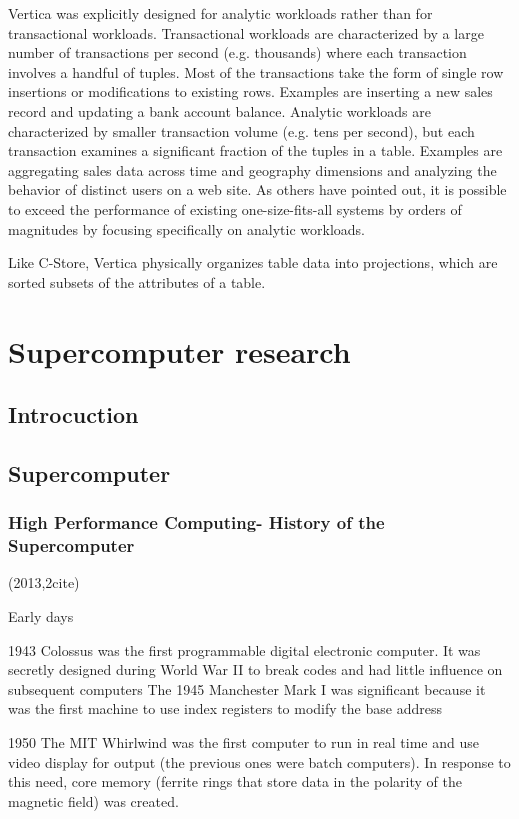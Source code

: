 \documentclass[a4paper,twoside]{scrbook}
\begin{document}
Vertica was explicitly designed for analytic workloads rather than for transactional workloads.
Transactional workloads are characterized by a large number of transactions per second (e.g. thousands) where each transaction involves a handful of tuples. Most of the transactions take the form of single row insertions or modifications to existing rows. Examples are inserting a new sales record and updating a bank account balance.
Analytic workloads are characterized by smaller transaction volume (e.g. tens per second), but each transaction examines a significant fraction of the tuples in a table. Examples are aggregating sales data across time and geography dimensions and analyzing the behavior of distinct users on a web site.
As others have pointed out, it is possible to exceed the performance of existing one-size-fits-all systems by orders of magnitudes by focusing specifically on analytic workloads.

Like C-Store, Vertica physically organizes table data into projections, which are sorted subsets of the attributes of a table. 



\chapter{Supercomputer research}
\section{Introcuction}
\section{Supercomputer}
\subsection{High Performance Computing- History of the Supercomputer\cite{probert2013high}}
(2013,2cite)\par
Early days

1943 Colossus was the first programmable digital electronic computer. It was secretly designed during World War II to break codes and had little influence on subsequent computers
The 1945 Manchester Mark I was significant because it was the first machine to use index registers to modify the base address

1950 The MIT Whirlwind was the first computer to run in real time and use video display for output (the previous ones were batch computers). In response to this need, core memory (ferrite rings that store data in the polarity of the magnetic field) was created.
\end{document}
